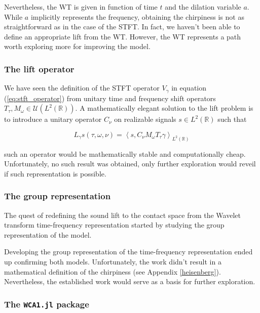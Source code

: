 \documentclass[american,]{article}
\theoremstyle{definition}
\theoremstyle{definition}
\theoremstyle{definition}
\theoremstyle{remark}
\begin{document}
Nevertheless, the WT is given in function of time \(t\) and the dilation variable \(a\).
While \(a\) implicitly represents the frequency, obtaining the chirpiness
is not as straightforward as in the case of the STFT.
In fact, we haven't been able to define an appropriate lift from the WT.
However, the WT represents a path worth exploring more for improving the model.

\hypertarget{the-lift-operator}{%
\subsubsection{The lift operator}\label{the-lift-operator}}

We have seen the definition of the STFT operator \(V_\gamma\) in equation (\ref{eq:stft_operator})
from unitary time and frequency shift operators \(T_\tau,M_\omega\in\mathcal{U}(L^2(\mathbb{R}))\).
A mathematically elegant solution to the lift problem is to introduce
a unitary operator \(C_\nu\) on realizable signals \(s\in L^2(\mathbb{R})\) such that

\begin{equation}
L_\gamma s(\tau,\omega,\nu) = \left\langle s,C_\nu M_\omega T_\tau \gamma\right\rangle_{L^2(\mathbb{R})}
\end{equation}

such an operator would be mathematically stable and computationally cheap.
Unfortunately, no such result was obtained, only further exploration
would reveil if such representation is possible.

\hypertarget{the-group-representation}{%
\subsubsection{The group representation}\label{the-group-representation}}

The quest of redefining the sound lift to the contact space from the Wavelet
transform time-frequency representation started by studying the group representation of the model.

Developing the group representation of the time-frequency representation ended up
confirming both models.
Unfortunately, the work didn't result in a mathematical definition of the chirpiness
(see Appendix \ref{heisenberg}).
Nevertheless, the established work would serve as a basis for further exploration.

\hypertarget{the-wca1.jl-package}{%
\subsubsection{\texorpdfstring{The \texttt{WCA1.jl} package}{The WCA1.jl package}}\label{the-wca1.jl-package}}
\end{document}
